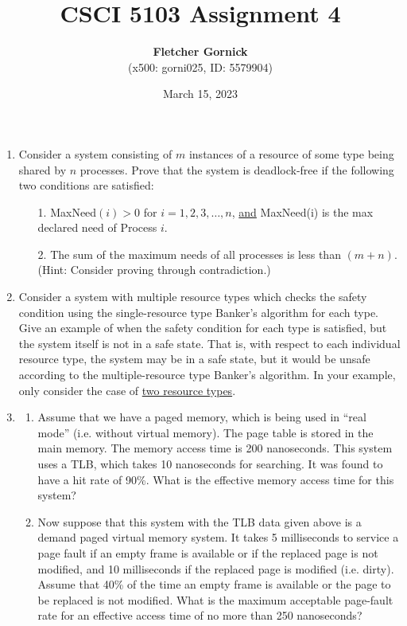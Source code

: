 \documentclass[11pt]{article}
\title{\vspace{-1.0cm}\textbf{CSCI 5103 Assignment 4}}
\date{March 15, 2023}
\author{\textbf{Fletcher Gornick}\\(x500: gorni025, ID: 5579904)}
\begin{document}
\maketitle

\begin{enumerate}
  \item Consider a system consisting of \(m\) instances of a resource of some type being shared by \(n\) processes.  Prove that the system is deadlock-free if the following two conditions are satisfied:
    \begin{enumerate}
      \item[1.] MaxNeed\((i) > 0\) for \(i=1,2,3,\hdots,n\), \underline{and} MaxNeed(i) is the max declared need of Process \(i\).
      \item[2.] The sum of the maximum needs of all processes is less than \((m+n)\).  (Hint: Consider proving through contradiction.)
    \end{enumerate}

  \newpage
  \item Consider a system with multiple resource types which checks the safety condition using the single-resource type Banker's algorithm for each type.  Give an example of when the safety condition for each type is satisfied, but the system itself is not in a safe state.  That is, with respect to each individual resource type, the system may be in a safe state, but it would be unsafe according to the multiple-resource type Banker's algorithm.  In your example, only consider the case of \underline{two resource types}.

  \newpage
  \item \begin{enumerate}
      \item Assume that we have a paged memory, which is being used in ``real mode'' (i.e. without virtual memory).  The page table is stored in the main memory.  The memory access time is 200 nanoseconds.  This system uses a TLB, which takes 10 nanoseconds for searching.  It was found to have a hit rate of 90\%.  What is the effective memory access time for this system?

      \item Now suppose that this system with the TLB data given above is a demand paged virtual memory system.  It takes 5 milliseconds to service a page fault if an empty frame is available or if the replaced page is not modified, and 10 milliseconds if the replaced page is modified (i.e. dirty).  Assume that 40\% of the time an empty frame is available or the page to be replaced is not modified. What is the maximum acceptable page-fault rate for an effective access time of no more than 250 nanoseconds?


\end{enumerate}
\end{enumerate}
\end{document}
